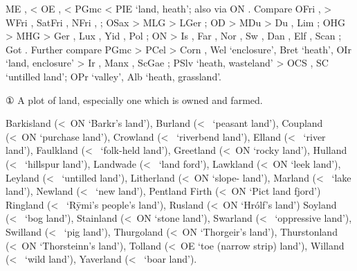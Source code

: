 \documentclass[12pt,letterpaper,oneside,article,draft]{memoir}
\begin{document}
\begin{Lemma}
\begin{Also}
\end{Also}
\begin{Etymology}
	ME ,  < OE ,  < PGmc  < PIE  ‘land, heath’;
		also via ON .
	Compare
	OFri ,  > WFri , SatFri , NFri , ;
	OSax  > MLG  > LGer ;
	OD  > MDu  > Du , Lim ;
	OHG  > MHG  > Ger , Lux ,
		Yid  , Pol ;
	ON  > Is , Far , Nor , Sw , Dan , Elf ,
		Scan ;
	Got  .
	Further compare
		PGmc  > PCel  > Corn , Wel  ‘enclosure’,
			Bret  ‘heath’,
			OIr  ‘land, enclosure’ > Ir \fm{lann}, Manx , ScGae ;
		PSlv  ‘heath, wasteland’ > OCS  ,
			SC   ‘untilled land’;
		OPr  ‘valley’,
		Alb  ‘heath, grassland’.
\end{Etymology}
\begin{Definitions}
	① A plot of land, especially one which is owned and farmed.
\end{Definitions}
\begin{Examples}
	Barkisland (<~ON  ‘Barkr’s land’), Burland (<~ ‘peasant land’), Coupland (<~ON  ‘purchase land’), Crowland (<~ ‘riverbend land’), Elland (<~ ‘river land’), Faulkland (<~ ‘folk-held land’), Greetland (<~ON  ‘rocky land’), Hulland (<~ ‘hillspur land’), Landwade (<~ ‘land ford’), Lawkland (<~ON  ‘leek land’), Leyland (<~ ‘untilled land’), Litherland (<~ON  ‘slope- land’), Marland (<~ ‘lake land’), Newland (<~ ‘new land’), Pentland Firth (<~ON  ‘Pict land fjord’) Ringland (<~ ‘Rȳmi’s people’s land’), Rusland (<~ON  ‘Hrólf’s land’) Soyland (<~ ‘bog land’), Stainland (<~ON  ‘stone land’), Swarland (<~ ‘oppressive land’), Swilland (<~ ‘pig land’), Thurgoland (<~ON  ‘Thorgeir’s land’), Thurstonland (<~ON  ‘Thorsteinn’s land’), Tolland (<~OE  ‘toe (narrow strip) land’), Willand (<~ ‘wild land’), Yaverland (<~ ‘boar land’).
\end{Examples}
\end{Lemma}
\end{document}

